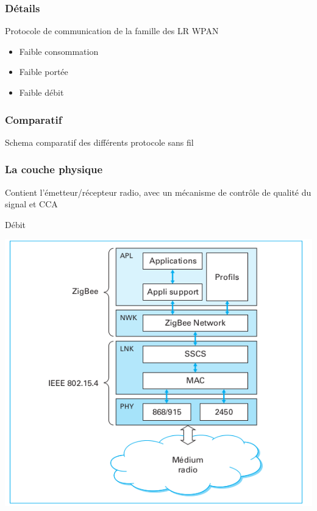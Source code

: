 \documentclass{beamer}
\begin{document}
  \begin{frame}
    \frametitle{Détails}
    Protocole de communication de la famille des LR WPAN
    \begin{itemize}
      \item Faible consommation
      \item Faible portée
      \item Faible débit
    \end{itemize}
  \end{frame}

  \begin{frame}
    \frametitle{Comparatif}
    \begin{block}{Schema comparatif des différents protocole sans fil}
    \end{block}
  \end{frame}
  
  \begin{frame}
    \frametitle{La couche physique}
    Contient l'émetteur/récepteur radio, avec un mécanisme de contrôle de qualité du signal et CCA
    \begin{block}{Débit}
      \begin{center}
       \includegraphics[scale=0.25]{OSI-Zigbee.png}
      \end{center}     
    \end{block}
  \end{frame}
  
\end{document}
